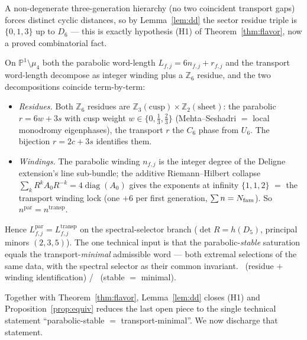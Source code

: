 \noindent A non-degenerate three-generation hierarchy (no two coincident transport gaps) forces distinct
cyclic distances, so by Lemma~\ref{lem:dd} the sector residue triple is $\{0,1,3\}$ up to $D_6$ ---
this is exactly hypothesis (H1) of Theorem~\ref{thm:flavor}, now a proved combinatorial fact.

\begin{proposition}
\label{prop:equiv}
On $\mathbb P^1\setminus\mu_4$ both the parabolic word-length $L_{f,j}=6n_{f,j}+r_{f,j}$ and the
transport word-length decompose as integer winding plus a $\mathbb Z_6$ residue, and the two
decompositions coincide term-by-term:
\begin{itemize}[leftmargin=1.5em]
\item \emph{Residues.} Both $\mathbb Z_6$ residues are $\mathbb Z_3(\text{cusp})\times\mathbb Z_2(\text{sheet})$:
the parabolic $r=6w+3s$ with cusp weight $w\in\{0,\tfrac13,\tfrac23\}$ (Mehta--Seshadri $=$ local
monodromy eigenphases), the transport $r$ the $C_6$ phase from $U_6$. The bijection $r=2c+3s$ identifies
them.
\item \emph{Windings.} The parabolic winding $n_{f,j}$ is the integer degree of the Deligne extension's
line sub-bundle; the additive Riemann--Hilbert collapse $\sum_k R^kA_0R^{-k}=4\operatorname{diag}(A_0)$
gives the exponents at infinity $\{1,1,2\}$ $=$ the transport winding lock (one $+6$ per first
generation, $\sum n=N_{\mathrm{fam}}$). So $n^{\mathrm{par}}=n^{\mathrm{transp}}$.
\end{itemize}
Hence $L^{\mathrm{par}}_{f,j}=L^{\mathrm{transp}}_{f,j}$ on the spectral-selector branch
($\det R=h(D_5)$, principal minors $(2,3,5)$). The one technical input is that the parabolic-\emph{stable}
saturation equals the transport-\emph{minimal} admissible word --- both extremal selections of the same
data, with the spectral selector as their common invariant. \mE\ (residue $+$ winding identification)
/ \mC\ (stable $=$ minimal).
\end{proposition}

\noindent Together with Theorem~\ref{thm:flavor}, Lemma~\ref{lem:dd} closes (H1) and
Proposition~\ref{prop:equiv} reduces the last open piece to the single technical statement
``parabolic-stable $=$ transport-minimal''. We now discharge that statement.

